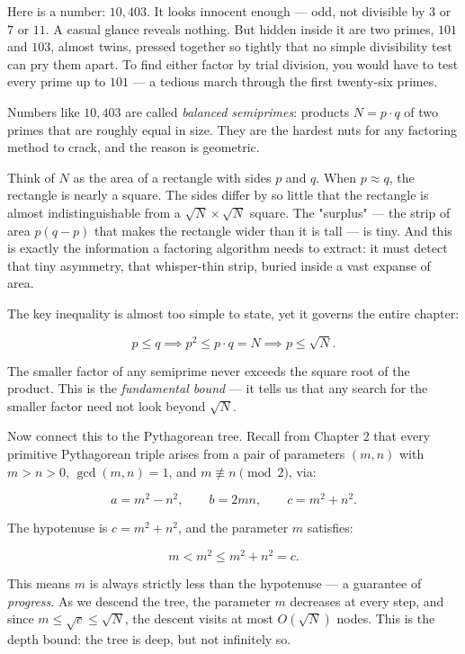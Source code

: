 \documentclass[11pt,openright,twoside]{book}
\theoremstyle{definition}
\begin{document}
Here is a number: $10{,}403$. It looks innocent enough --- odd, not divisible by $3$ or $7$ or $11$. A casual glance reveals nothing. But hidden inside it are two primes, $101$ and $103$, almost twins, pressed together so tightly that no simple divisibility test can pry them apart. To find either factor by trial division, you would have to test every prime up to $101$ --- a tedious march through the first twenty-six primes.

Numbers like $10{,}403$ are called \textit{balanced semiprimes}: products $N = p \cdot q$ of two primes that are roughly equal in size. They are the hardest nuts for any factoring method to crack, and the reason is geometric.

Think of $N$ as the area of a rectangle with sides $p$ and $q$. When $p \approx q$, the rectangle is nearly a square. The sides differ by so little that the rectangle is almost indistinguishable from a $\sqrt{N} \times \sqrt{N}$ square. The "surplus" --- the strip of area $p(q - p)$ that makes the rectangle wider than it is tall --- is tiny. And this is exactly the information a factoring algorithm needs to extract: it must detect that tiny asymmetry, that whisper-thin strip, buried inside a vast expanse of area.

The key inequality is almost too simple to state, yet it governs the entire chapter:

\[p \le q \implies p^2 \le p \cdot q = N \implies p \le \sqrt{N}.\]

The smaller factor of any semiprime never exceeds the square root of the product. This is the \textit{fundamental bound} --- it tells us that any search for the smaller factor need not look beyond $\sqrt{N}$.

Now connect this to the Pythagorean tree. Recall from Chapter 2 that every primitive Pythagorean triple arises from a pair of parameters $(m, n)$ with $m > n > 0$, $\gcd(m, n) = 1$, and $m \not\equiv n \pmod{2}$, via:

\[a = m^2 - n^2, \qquad b = 2mn, \qquad c = m^2 + n^2.\]

The hypotenuse is $c = m^2 + n^2$, and the parameter $m$ satisfies:

\[m < m^2 \le m^2 + n^2 = c.\]

This means $m$ is always strictly less than the hypotenuse --- a guarantee of \textit{progress}. As we descend the tree, the parameter $m$ decreases at every step, and since $m \le \sqrt{c} \le \sqrt{N}$, the descent visits at most $O(\sqrt{N})$ nodes. This is the depth bound: the tree is deep, but not infinitely so.
\end{document}
